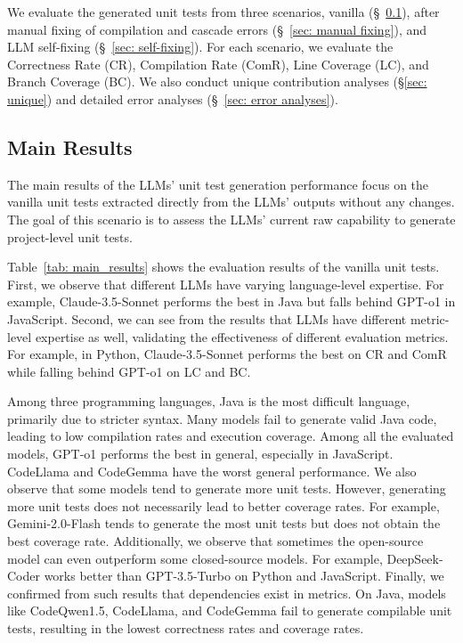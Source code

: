 We evaluate the generated unit tests from three scenarios, vanilla (\S~\ref{sec: main results}), after manual fixing of compilation and cascade errors (\S~\ref{sec: manual fixing}), and LLM self-fixing (\S~\ref{sec: self-fixing}). For each scenario, we evaluate the Correctness Rate (CR), Compilation Rate (ComR), Line Coverage (LC), and Branch Coverage (BC). We also conduct unique contribution analyses (\S\ref{sec: unique}) and detailed error analyses (\S~\ref{sec: error analyses}).

\subsection{Main Results}
\label{sec: main results}

The main results of the LLMs' unit test generation performance focus on the vanilla unit tests extracted directly from the LLMs' outputs without any changes. The goal of this scenario is to assess the LLMs' current raw capability to generate project-level unit tests.

Table~\ref{tab: main_results} shows the evaluation results of the vanilla unit tests.
First, we observe that different LLMs have varying language-level expertise. For example, Claude-3.5-Sonnet performs the best in Java but falls behind GPT-o1 in JavaScript.
Second, we can see from the results that LLMs have different metric-level expertise as well, validating the effectiveness of different evaluation metrics. For example, in Python,  Claude-3.5-Sonnet performs the best on CR and ComR while falling behind GPT-o1 on LC and BC.

Among three programming languages, Java is the most difficult language, primarily due to stricter syntax. Many models fail to generate valid Java code, leading to low compilation rates and execution coverage.
Among all the evaluated models, GPT-o1 performs the best in general, especially in JavaScript. CodeLlama and CodeGemma have the worst general performance.
We also observe that some models tend to generate more unit tests. However, generating more unit tests does not necessarily lead to better coverage rates. For example, Gemini-2.0-Flash tends to generate the most unit tests but does not obtain the best coverage rate. 
Additionally, we observe that sometimes the open-source model can even outperform some closed-source models. For example, DeepSeek-Coder works better than GPT-3.5-Turbo on Python and JavaScript.
Finally, we confirmed from such results that dependencies exist in metrics. On Java, models like CodeQwen1.5, CodeLlama, and CodeGemma fail to generate compilable unit tests, resulting in the lowest correctness rates and coverage rates.  

